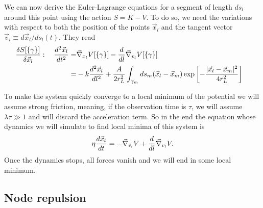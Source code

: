 \documentclass[nofootinbib,preprint,floatfix,titlepage,superscriptaddress]{revtex4} %
\newcommand{\outNim}[1]{}
\begin{document}
\outNim{
{
\color{red} !!! Needs correction!!!}
\[K_l [\gamma_l]\equiv \int_{\gamma_l} dl \left|d^2 \vec{x}_l \over dt dl\right|^2.\]
} %
We can now derive the Euler-Lagrange equations for a segment of length $ds_l$ around this point using the action $S = K- V$. To do so, we need the variations with respect to both the position of the points $\vec{x}_l$ and the tangent vector $\vec{v}_l \equiv  d\vec{x}_l/ds_l(t)$. They read 
\begin{align} 
{\delta S[\{\gamma\}] \over \delta \vec{x}_l} : \quad {d^2 \vec{x}_l \over dt^2 }  
=&  \vec{\nabla}_{{x}_l} V[\{\gamma\}]- {d\over dl} \vec{\nabla}_{{v}_l} V[\{\gamma\}] \cr
=& -k {d^2\vec{x}_l\over dl^2} + {A\over 2 r_L^2}\int_{\gamma_m} ds_m
 (\vec{x}_l-\vec{x}_m)\exp\left[- {|\vec{x}_l-\vec{x}_m|^2 \over 4 r_L^2}\right]
\end{align}


To make the system quickly converge to a local minimum of the potential we will assume strong friction, meaning, if the observation time is $\tau$, we will assume $\lambda \tau \gg 1$ and will discard the acceleration term. So in the end the equation whose dynamics we will simulate to find local minima of this system is 
\begin{equation}
\eta {d \vec{x}_l \over dt }  
= - \vec{\nabla}_{{v}_l} V + {d\over dl} \vec{\nabla}_{{v}_l} V\label{eq:Langevin1}.
\end{equation}
Once the dynamics stops, all forces vanish and we will end in some local minimum. 

\subsection{Node repulsion}
\end{document}
